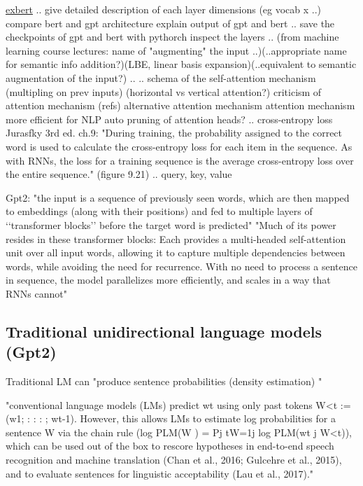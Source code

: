 \href{https://huggingface.co/exbert/?model=gpt2&modelKind=bidirectional&sentence=The%20girl%20ran%20to%20a%20local%20pub%20to%20escape%20the%20din%20of%20her%20city.&layer=0&heads=..0,1,2,3,4,5,6,7,8,9,10,11&threshold=0.7&tokenInd=null&tokenSide=null&maskInds=..&hideClsSep=true}{exbert}
..
give detailed description of each layer dimensions (eg vocab x ..)
compare bert and gpt architecture
explain output of gpt and bert
..
save the checkpoints of gpt and bert with pythorch inspect the layers
..
(from machine learning course lectures: name of "augmenting" the input ..)(..appropriate name for semantic info addition?)(LBE, linear basis expansion)(..equivalent to semantic augmentation of the input?)
..
..
schema of the self-attention mechanism (multipling on prev inputs)
(horizontal vs vertical attention?)
criticism of attention mechanism (refs)
alternative attention mechanism
attention mechanism more efficient for NLP
auto pruning of attention heads?
..
cross-entropy loss
Jurasfky 3rd ed. ch.9: "During training, the probability assigned to the correct word is used to calculate the cross-entropy loss for each item in the sequence. As with RNNs, the loss for a training sequence is the average cross-entropy loss over the entire sequence." 
(figure 9.21)
..
query, key, value

Gpt2:
"the input is a sequence of previously seen words, which are then mapped to embeddings (along with their positions) and
fed to multiple layers of ‘‘transformer blocks’’
before the target word is predicted" \citep{lau2020furiously}
"Much of its power resides in these transformer blocks: Each
provides a multi-headed self-attention unit over all input words, allowing it to capture multiple dependencies between words, while avoiding the need for recurrence. With no need to process a sentence in sequence, the model parallelizes more efficiently, and scales in a way that RNNs cannot" \citep{lau2020furiously}

\pagebreak

\subsection{Traditional unidirectional language models (Gpt2)}

Traditional LM can "produce sentence probabilities (density estimation) " \citep{salazar2020masked}

"conventional language models (LMs) predict wt using only past tokens W<t := (w1; : : : ; wt-1). However, this allows LMs to estimate log probabilities for a sentence W via the chain rule (log PLM(W ) = Pj tW=1j log PLM(wt j W<t)), which can be used out of the box to rescore hypotheses in end-to-end speech recognition and machine translation (Chan et al., 2016; Gulcehre
et al., 2015), and to evaluate sentences for linguistic
acceptability (Lau et al., 2017)."  \citep{salazar2020masked}

